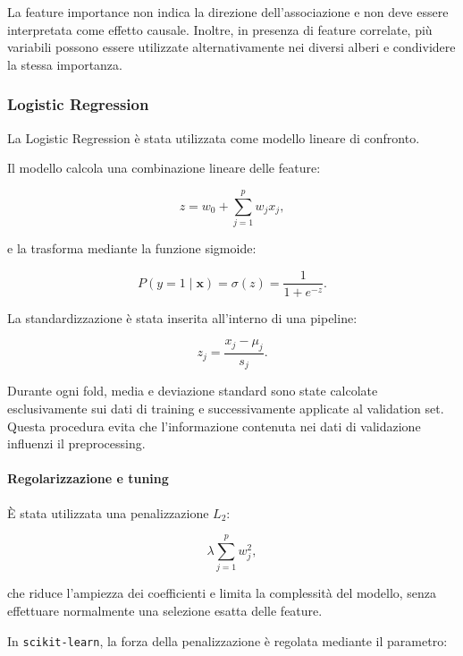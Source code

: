 La feature importance non indica la direzione dell'associazione e non
deve essere interpretata come effetto causale. Inoltre, in presenza di
feature correlate, più variabili possono essere utilizzate
alternativamente nei diversi alberi e condividere la stessa
importanza.


\subsubsection{Logistic Regression}

La Logistic Regression è stata utilizzata come modello lineare di
confronto.

Il modello calcola una combinazione lineare delle feature:

\begin{equation}
	z
	=
	w_0
	+
	\sum_{j=1}^{p}w_jx_j,
\end{equation}

e la trasforma mediante la funzione sigmoide:

\begin{equation}
	P(y=1\mid\mathbf{x})
	=
	\sigma(z)
	=
	\frac{1}{1+e^{-z}}.
\end{equation}



La standardizzazione è stata inserita all'interno di una pipeline:

\begin{equation}
	z_j
	=
	\frac{x_j-\mu_j}{s_j}.
\end{equation}

Durante ogni fold, media e deviazione standard sono state calcolate
esclusivamente sui dati di training e successivamente applicate al
validation set. Questa procedura evita che l'informazione contenuta
nei dati di validazione influenzi il preprocessing.


\paragraph{Regolarizzazione e tuning}

È stata utilizzata una penalizzazione $L_2$:

\begin{equation}
	\lambda
	\sum_{j=1}^{p}w_j^2,
\end{equation}

che riduce l'ampiezza dei coefficienti e limita la complessità del
modello, senza effettuare normalmente una selezione esatta delle
feature.

In \texttt{scikit-learn}, la forza della penalizzazione è regolata
mediante il parametro:

